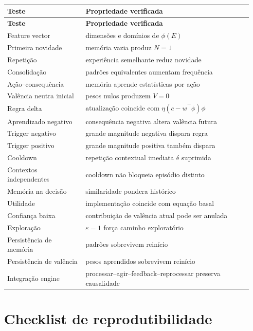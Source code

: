 \begin{longtable}{p{}p{}}
\toprule
\textbf{Teste} & \textbf{Propriedade verificada}\\
\midrule
\endfirsthead
\toprule
\textbf{Teste} & \textbf{Propriedade verificada}\\
\midrule
\endhead
Feature vector & dimensões e domínios de \(\phi(E)\)\\
Primeira novidade & memória vazia produz \(N=1\)\\
Repetição & experiência semelhante reduz novidade\\
Consolidação & padrões equivalentes aumentam frequência\\
Ação--consequência & memória aprende estatísticas por ação\\
Valência neutra inicial & pesos nulos produzem \(V=0\)\\
Regra delta & atualização coincide com \(\eta(c-w^\top\phi)\phi\)\\
Aprendizado negativo & consequência negativa altera valência futura\\
Trigger negativo & grande magnitude negativa dispara regra\\
Trigger positivo & grande magnitude positiva também dispara\\
Cooldown & repetição contextual imediata é suprimida\\
Contextos independentes & cooldown não bloqueia episódio distinto\\
Memória na decisão & similaridade pondera histórico\\
Utilidade & implementação coincide com equação basal\\
Confiança baixa & contribuição de valência atual pode ser anulada\\
Exploração & \(\varepsilon=1\) força caminho exploratório\\
Persistência de memória & padrões sobrevivem reinício\\
Persistência de valência & pesos aprendidos sobrevivem reinício\\
Integração engine & processar--agir--feedback--reprocessar preserva causalidade\\
\bottomrule
\end{longtable}

\section{Checklist de reprodutibilidade}

